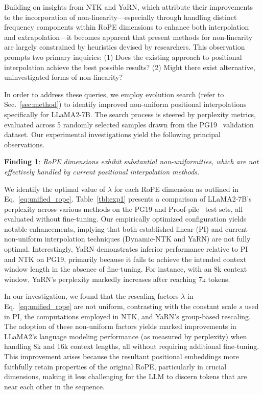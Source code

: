 Building on insights from NTK and YaRN, which attribute their improvements to the incorporation of non-linearity—especially through handling distinct frequency components within RoPE dimensions to enhance both interpolation and extrapolation—it becomes apparent that present methods for non-linearity are largely constrained by heuristics devised by researchers. This observation prompts two primary inquiries: (1) Does the existing approach to positional interpolation achieve the best possible results? (2) Might there exist alternative, uninvestigated forms of non-linearity?

In order to address these queries, we employ evolution search (refer to Sec.~\ref{sec:method}) to identify improved non-uniform positional interpolations specifically for LLaMA2-7B. The search process is steered by perplexity metrics, evaluated across 5 randomly selected samples drawn from the PG19~\cite{pg19} validation dataset. Our experimental investigations yield the following principal observations.

\textbf{Finding 1}: \textit{RoPE dimensions exhibit substantial non-uniformities, which are not effectively handled by current positional interpolation methods.}

We identify the optimal value of $\lambda$ for each RoPE dimension as outlined in Eq.~\ref{eq:unified_rope}. Table~\ref{tbl:exp1} presents a comparison of LLaMA2-7B’s perplexity across various methods on the PG19 and Proof-pile~\cite{proof-pile} test sets, all evaluated without fine-tuning. Our empirically optimized configuration yields notable enhancements, implying that both established linear (PI) and current non-uniform interpolation techniques (Dynamic-NTK and YaRN) are not fully optimal. Interestingly, YaRN demonstrates inferior performance relative to PI and NTK on PG19, primarily because it fails to achieve the intended context window length in the absence of fine-tuning. For instance, with an 8k context window, YaRN’s perplexity markedly increases after reaching 7k tokens.

In our investigation, we found that the rescaling factors $\lambda$ in Eq.~\ref{eq:unified_rope} are not uniform, contrasting with the constant scale $s$ used in PI, the computations employed in NTK, and YaRN's group-based rescaling. The adoption of these non-uniform factors yields marked improvements in LLaMA2’s language modeling performance (as measured by perplexity) when handling 8k and 16k context lengths, all without requiring additional fine-tuning. This improvement arises because the resultant positional embeddings more faithfully retain properties of the original RoPE, particularly in crucial dimensions, making it less challenging for the LLM to discern tokens that are near each other in the sequence.


